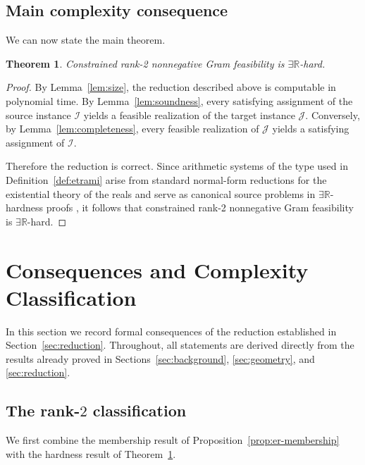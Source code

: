 \documentclass[11pt]{article}
\newtheorem{theorem}{Theorem}[section]
\begin{document}
\subsection{Main complexity consequence}
\label{subsec:main-consequence}

We can now state the main theorem.

\begin{theorem}
\label{thm:hardness}
Constrained rank-2 nonnegative Gram feasibility is
\(\exists\mathbb{R}\)-hard.
\end{theorem}

\begin{proof}
By Lemma~\ref{lem:size}, the reduction described above is computable in
polynomial time. By Lemma~\ref{lem:soundness}, every satisfying assignment of
the source instance \(\mathcal{I}\) yields a feasible realization of the
target instance \(\mathcal{J}\). Conversely, by
Lemma~\ref{lem:completeness}, every feasible realization of \(\mathcal{J}\)
yields a satisfying assignment of \(\mathcal{I}\).

Therefore the reduction is correct. Since arithmetic systems of the type used
in Definition~\ref{def:etrami} arise from standard normal-form reductions for
the existential theory of the reals and serve as canonical source problems in
\(\exists\mathbb{R}\)-hardness proofs
\cite{schaefer2010complexity,cardinal2013survey}, it follows that constrained
rank-2 nonnegative Gram feasibility is \(\exists\mathbb{R}\)-hard.
\end{proof}

\section{Consequences and Complexity Classification}
\label{sec:consequences}

In this section we record formal consequences of the reduction established in
Section~\ref{sec:reduction}. Throughout, all statements are derived directly
from the results already proved in Sections~\ref{sec:background},
\ref{sec:geometry}, and \ref{sec:reduction}.

\subsection{The rank-$2$ classification}

We first combine the membership result of
Proposition~\ref{prop:er-membership} with the hardness result of
Theorem~\ref{thm:hardness}.
\end{document}
